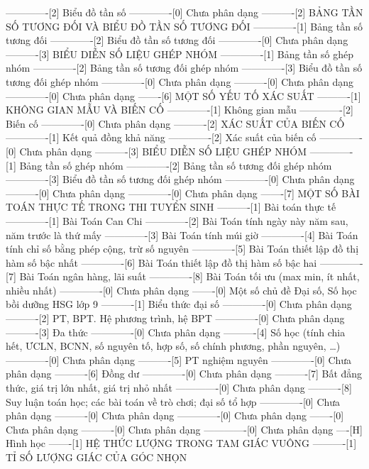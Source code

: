 -------------[2] Biểu đồ tần số
-------------[0] Chưa phân dạng
----------[2] BẢNG TẦN SỐ TƯƠNG ĐỐI VÀ BIỂU ĐỒ TẦN SỐ TƯƠNG ĐỐI
-------------[1] Bảng tần số tương đối
-------------[2] Biểu đồ tần số tương đối
-------------[0] Chưa phân dạng
----------[3] BIỂU DIỄN SỐ LIỆU GHÉP NHÓM
-------------[1] Bảng tần số ghép nhóm
-------------[2] Bảng tần số tương đối ghép nhóm
-------------[3] Biểu đồ tần số tương đối ghép nhóm
-------------[0] Chưa phân dạng
----------[0] Chưa phân dạng
-------------[0] Chưa phân dạng
-------[6] MỘT SỐ YẾU TỐ XÁC SUẤT
----------[1] KHÔNG GIAN MẪU VÀ BIẾN CỐ
-------------[1] Không gian mẫu
-------------[2] Biến cố
-------------[0] Chưa phân dạng
----------[2] XÁC SUẤT CỦA BIẾN CỐ
-------------[1] Kết quả đồng khả năng
-------------[2] Xác suất của biến cố
-------------[0] Chưa phân dạng
----------[3] BIỂU DIỄN SỐ LIỆU GHÉP NHÓM
-------------[1] Bảng tần số ghép nhóm
-------------[2] Bảng tần số tương đối ghép nhóm
-------------[3] Biểu đồ tần số tương đối ghép nhóm
-------------[0] Chưa phân dạng
----------[0] Chưa phân dạng
-------------[0] Chưa phân dạng
-------[7] MỘT SỐ BÀI TOÁN THỰC TẾ TRONG THI TUYỂN SINH
----------[1] Bài toán thực tế
-------------[1] Bài Toán Can Chi
-------------[2] Bài Toán tính ngày này năm sau, năm trước là thứ mấy
-------------[3] Bài Toán tính múi giờ
-------------[4] Bài Toán tính chỉ số bằng phép cộng, trừ số nguyên
-------------[5] Bài Toán thiết lập đồ thị hàm số bậc nhất
-------------[6] Bài Toán thiết lập đồ thị hàm số bậc hai
-------------[7] Bài Toán ngân hàng, lãi suất
-------------[8] Bài Toán tối ưu (max min, ít nhất, nhiều nhất)
-------------[0] Chưa phân dạng
-------[0] Một số chủ đề Đại số, Số học bồi dưỡng HSG lớp 9
----------[1] Biểu thức đại số
-------------[0] Chưa phân dạng
----------[2] PT, BPT. Hệ phương trình, hệ BPT
-------------[0] Chưa phân dạng
----------[3] Đa thức
-------------[0] Chưa phân dạng
----------[4] Số học (tính chia hết, ƯCLN, BCNN, số nguyên tố, hợp số, số chính phương, phần nguyên, \ldots)
-------------[0] Chưa phân dạng
----------[5] PT nghiệm nguyên
-------------[0] Chưa phân dạng
----------[6] Đồng dư
-------------[0] Chưa phân dạng
----------[7] Bất đẳng thức, giá trị lớn nhất, giá trị nhỏ nhất
-------------[0] Chưa phân dạng
----------[8] Suy luận toán học; các bài toán về trò chơi; đại số tổ hợp
-------------[0] Chưa phân dạng
----------[0] Chưa phân dạng
-------------[0] Chưa phân dạng
-------[0] Chưa phân dạng
----------[0] Chưa phân dạng
-------------[0] Chưa phân dạng
----[H] Hình học
-------[1] HỆ THỨC LƯỢNG TRONG TAM GIÁC VUÔNG
----------[1] TỈ SỐ LƯỢNG GIÁC CỦA GÓC NHỌN
